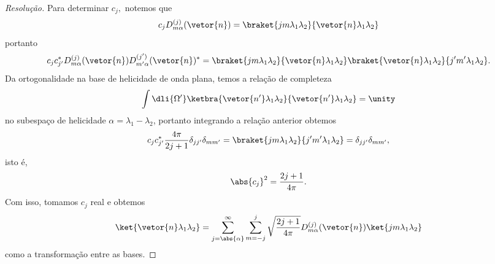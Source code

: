 \begin{proof}[Resolução]
   Para determinar \(c_j,\) notemos que
   \begin{equation*}
      c_j D^{(j)}_{m \alpha}(\vetor{n}) = \braket{j m \lambda_1 \lambda_2}{\vetor{n} \lambda_1 \lambda_2}
   \end{equation*}
   portanto
   \begin{equation*}
      c_j c_{j'}^* D^{(j)}_{m \alpha}(\vetor{n}) D^{(j')}_{m' \alpha}(\vetor{n})^* = \braket{j m \lambda_1 \lambda_2}{\vetor{n} \lambda_1 \lambda_2} \braket{\vetor{n} \lambda_1 \lambda_2}{j' m' \lambda_1 \lambda_2}.
   \end{equation*}
   Da ortogonalidade na base de helicidade de onda plana, temos a relação de completeza
   \begin{equation*}
      \int \dli{\Omega'} \ketbra{\vetor{n'} \lambda_1 \lambda_2}{\vetor{n'} \lambda_1 \lambda_2} = \unity
   \end{equation*}
   no subespaço de helicidade \(\alpha = \lambda_1 - \lambda_2\),
   portanto integrando a relação anterior obtemos
   \begin{equation*}
      c_j c_{j'}^* \frac{4\pi}{2j + 1} \delta_{jj'} \delta_{mm'} = \braket{jm \lambda_1 \lambda_2}{j' m' \lambda_1 \lambda_2} = \delta_{jj'} \delta_{mm'},
   \end{equation*}
   isto é, 
   \begin{equation*}
      \abs{c_j}^2 = \frac{2j + 1}{4\pi}.
   \end{equation*}
   Com isso, tomamos \(c_j\) real e obtemos
   \begin{equation*}
      \ket{\vetor{n} \lambda_1 \lambda_2} = \sum_{j = \abs{\alpha}}^{\infty}{\sum_{m = -j}^{j}{\sqrt{\frac{2j + 1}{4\pi}} D^{(j)}_{m \alpha}(\vetor{n}) \ket{j m \lambda_1 \lambda_2}}}
   \end{equation*}
   como a transformação entre as bases.
\end{proof}
